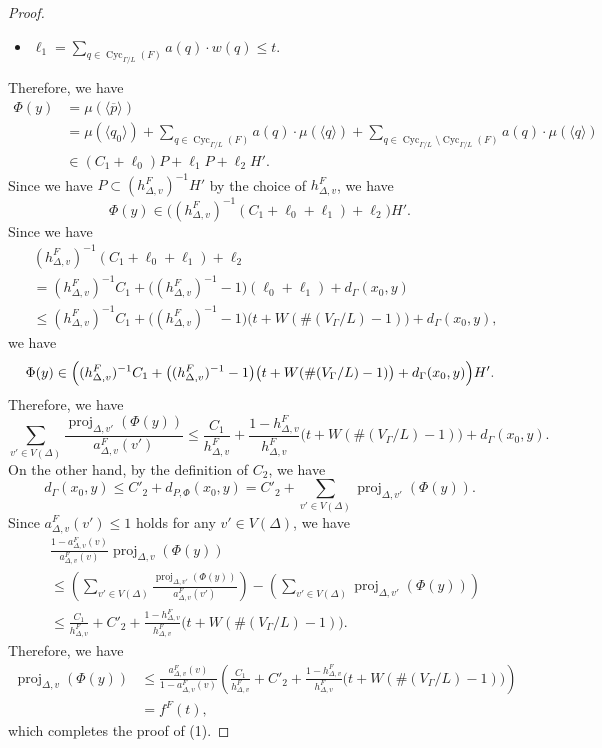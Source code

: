 \documentclass[11pt]{article}
\theoremstyle{definition}
\numberwithin{equation}{section}
\begin{document}
\begin{proof}
\begin{itemize}
\item
$\ell _1 = 
\sum _{q \in \operatorname{Cyc}_{\Gamma /L}(F)} a(q) \cdot w(q) \le t$.
\end{itemize}
Therefore, we have
\begin{align*}
\Phi (y) &= \mu(\langle \overline{p} \rangle) \\
&= \mu(\langle q_0 \rangle)
+ \sum _{q \in \operatorname{Cyc}_{\Gamma /L}(F)} a(q) \cdot \mu(\langle q \rangle)+ 
\sum _{q \in \operatorname{Cyc}_{\Gamma /L} \setminus \operatorname{Cyc}_{\Gamma /L}(F)} a(q) \cdot \mu(\langle q \rangle) \\
&\in (C_1 + \ell _0)P + \ell _1 P + \ell _2 H'. 
\end{align*}
Since we have $P \subset (h^F _{\Delta, v})^{-1} H'$ by the choice of $h^F _{\Delta, v}$, we have
\[
\Phi (y) \in \bigl( (h^F _{\Delta, v})^{-1} ( C_1 + \ell _0 + \ell _1) + \ell _2 \bigr) H'. 
\]
Since we have
\begin{align*}
&(h^F _{\Delta, v})^{-1} ( C_1 + \ell _0 + \ell _1) + \ell _2 \\
&= (h^F _{\Delta, v})^{-1} C_1 + \bigl( (h^F _{\Delta, v})^{-1} - 1 \bigr) (\ell _0 + \ell _1) + d_{\Gamma}(x_0, y)\\
&\le (h^F _{\Delta, v})^{-1} C_1 + \bigl( (h^F _{\Delta, v})^{-1} - 1 \bigr) \bigl( t + W( \#(V_{\Gamma}/L) -1) \bigr) + d_{\Gamma}(x_0, y), 
\end{align*}
we have 
\[
\Phi (y) \in 
\Bigl( 
(h^F _{\Delta, v})^{-1} C_1 + \bigl( (h^F _{\Delta, v})^{-1} - 1 \bigr) 
\bigl( t + W(\#(V_{\Gamma}/L) -1) \bigr) + d_{\Gamma}(x_0, y)
\Bigr)H'. 
\]
Therefore, we have 
\[
\sum _{v' \in V(\Delta)} \frac{\operatorname{proj}_{\Delta, v'}(\Phi(y))}{a^F _{\Delta, v}(v')} \le 
\frac{C_1}{h^F _{\Delta, v}} + \frac{1 - h^F _{\Delta, v}}{h^F _{\Delta, v}} \bigl( t + W( \#(V_{\Gamma}/L) -1) \bigr) +  d_{\Gamma}(x_0, y). 
\]
On the other hand, by the definition of $C_2$, we have 
\[
d_{\Gamma}(x_0, y) \le C'_2 + d_{P, \Phi}(x_0, y) = 
C'_2 + \sum _{v' \in V(\Delta)} \operatorname{proj}_{\Delta, v'}(\Phi(y)). 
\]
Since $a^F _{\Delta, v}(v') \le 1$ holds for any $v' \in V(\Delta)$, we have
\begin{align*}
&\frac{1- a^F _{\Delta, v}(v)}{a^F _{\Delta, v}(v)} \operatorname{proj}_{\Delta, v}(\Phi(y)) \\
&\le
\left( \sum _{v' \in V(\Delta)} \frac{\operatorname{proj}_{\Delta, v'}(\Phi(y))}{a^F _{\Delta, v}(v')} \right) - 
\left( \sum _{v' \in V(\Delta)} \operatorname{proj}_{\Delta, v'}(\Phi(y)) \right) \\
&\le
\frac{C_1}{h^F _{\Delta, v}} + C'_2 + \frac{1 - h^F _{\Delta, v}}{h^F _{\Delta, v}} 
\bigl( t + W (\#(V_{\Gamma}/L) -1) \bigr). 
\end{align*}
Therefore, we have
\begin{align*}
\operatorname{proj}_{\Delta, v}(\Phi(y))
&\le \frac{a^F _{\Delta, v}(v)}{1- a^F _{\Delta, v}(v)}
	\left( \frac{C_1}{h^F _{\Delta, v}} + C'_2 + \frac{1 - h^F _{\Delta, v}}{h^F _{\Delta, v}} 
\bigl( t + W (\#(V_{\Gamma}/L) -1) \bigr) \right) \\
&= f^F(t), 
\end{align*}
which completes the proof of (1). 


\end{proof}
\end{document}
